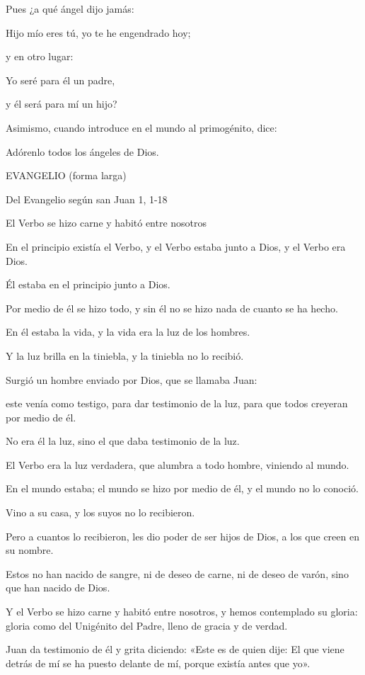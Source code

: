 \documentclass[]{article}
\begin{document}
Pues ¿a qué ángel dijo jamás:

Hijo mío eres tú, yo te he engendrado hoy;

y en otro lugar:

Yo seré para él un padre,

y él será para mí un hijo?

Asimismo, cuando introduce en el mundo al primogénito, dice:

Adórenlo todos los ángeles de Dios.

EVANGELIO (forma larga)

Del Evangelio según san Juan 1, 1-18

El Verbo se hizo carne y habitó entre nosotros

En el principio existía el Verbo, y el Verbo estaba junto a Dios, y el
Verbo era Dios.

Él estaba en el principio junto a Dios.

Por medio de él se hizo todo, y sin él no se hizo nada de cuanto se ha
hecho.

En él estaba la vida, y la vida era la luz de los hombres.

Y la luz brilla en la tiniebla, y la tiniebla no lo recibió.

Surgió un hombre enviado por Dios, que se llamaba Juan:

este venía como testigo, para dar testimonio de la luz, para que todos
creyeran por medio de él.

No era él la luz, sino el que daba testimonio de la luz.

El Verbo era la luz verdadera, que alumbra a todo hombre, viniendo al
mundo.

En el mundo estaba; el mundo se hizo por medio de él, y el mundo no lo
conoció.

Vino a su casa, y los suyos no lo recibieron.

Pero a cuantos lo recibieron, les dio poder de ser hijos de Dios, a los
que creen en su nombre.

Estos no han nacido de sangre, ni de deseo de carne, ni de deseo de
varón, sino que han nacido de Dios.

Y el Verbo se hizo carne y habitó entre nosotros, y hemos contemplado su
gloria: gloria como del Unigénito del Padre, lleno de gracia y de
verdad.

Juan da testimonio de él y grita diciendo: «Este es de quien dije: El
que viene detrás de mí se ha puesto delante de mí, porque existía antes
que yo».
\end{document}
